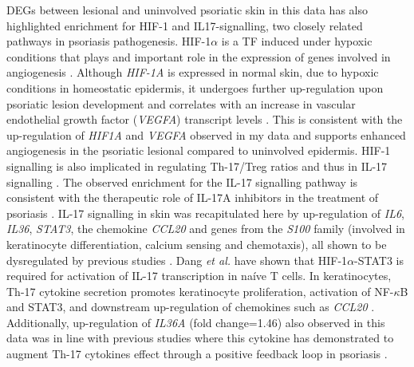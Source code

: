 DEGs between lesional and uninvolved psoriatic skin in this data has also highlighted enrichment for HIF-1 and IL17-signalling, two closely related pathways in psoriasis pathogenesis. HIF-1$\alpha$ is a TF induced under hypoxic conditions that plays and important role in the expression of genes involved in angiogenesis \parencite{Forsythe1996}. Although \textit{HIF-1A} is expressed in normal skin, due to hypoxic conditions in homeostatic epidermis, it undergoes further up-regulation upon psoriatic lesion development and correlates with an increase in vascular endothelial growth factor (\textit{VEGFA}) transcript levels \parencite{Rosenberger2007}. This is consistent with the up-regulation of \textit{HIF1A} and \textit{VEGFA} observed in my data and supports enhanced angiogenesis in the psoriatic lesional compared to uninvolved epidermis. HIF-1 signalling is also implicated in regulating Th-17/Treg ratios and thus in IL-17 signalling \parencite{Dang2011,Shi2011}. The observed enrichment for the IL-17 signalling pathway is consistent with the therapeutic role of IL-17A inhibitors in the treatment of psoriasis \parencite{Mahil2016,Coates2016a}. IL-17 signalling in skin was recapitulated here by up-regulation of \textit{IL6}, \textit{IL36}, \textit{STAT3}, the chemokine \textit{CCL20} and genes from the \textit{S100} family (involved in keratinocyte differentiation, calcium sensing and chemotaxis), all shown to be dysregulated by previous studies \parencite{Tsoi2015,Tervaniemi2016}. %
Dang \textit{et al.} have shown that HIF-1$\alpha$-STAT3 is required for activation of IL-17 transcription in na\'{i}ve T cells. In keratinocytes, Th-17 cytokine secretion promotes keratinocyte proliferation, activation of NF-$\kappa$B and STAT3, and downstream up-regulation of chemokines such as \textit{CCL20} \parencite{Carrier2011,Harper2009}. Additionally, up-regulation of \textit{IL36A} (fold change=1.46) also observed in this data was in line with previous studies where this cytokine has demonstrated to augment Th-17 cytokines effect through a positive feedback loop in psoriasis \parencite{Keerman2015,Tervaniemi2016,Carrier2011}.

